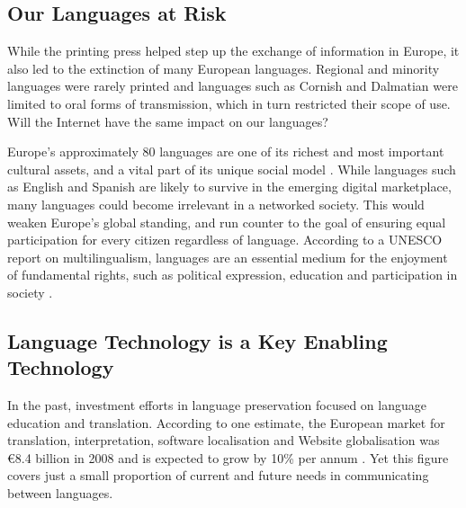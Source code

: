 \begin{multicols}{2}
\subsection{Our Languages at Risk}

    While the printing press helped step up the exchange of information in Europe, it also led to the extinction of many European languages. Regional and minority languages were rarely printed and languages such as Cornish and Dalmatian were limited to oral forms of transmission, which in turn restricted their scope of use. Will the Internet have the same impact on our languages?


    Europe’s approximately 80 languages are one of its richest and most important cultural assets, and a vital part of its unique social model \cite{CAT-Nota2}. While languages such as English and Spanish are likely to survive in the emerging digital marketplace, many languages could become irrelevant in a networked society. This would weaken Europe’s global standing, and run counter to the goal of ensuring equal participation for every citizen regardless of language. According to a UNESCO report on multilingualism, languages are an essential medium for the enjoyment of fundamental rights, such as political expression, education and participation in society \cite{CAT-Nota3}.

\subsection{Language Technology is a Key Enabling Technology}

    In the past, investment efforts in language preservation focused on language education and translation. According to one estimate, the European market for translation, interpretation, software localisation and Website globalisation was €8.4 billion in 2008 and is expected to grow by 10\% per annum \cite{CAT-Nota3}. Yet this figure covers just a small proportion of current and future needs in communicating between languages. 


\end{multicols}
